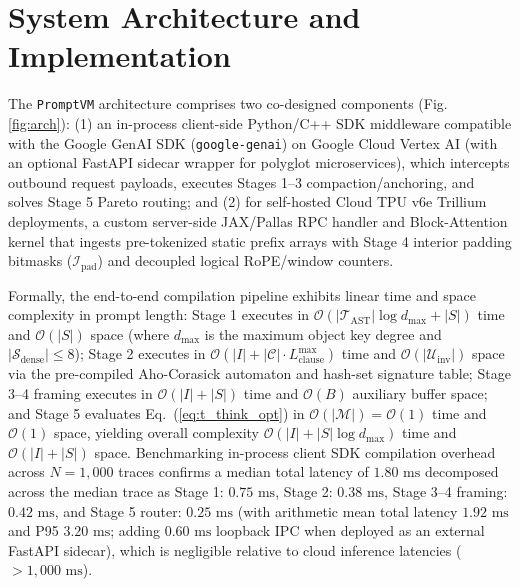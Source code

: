 \documentclass[conference,10pt]{IEEEtran}
\begin{document}
\section{System Architecture and Implementation}
\label{sec:impl}
The \texttt{PromptVM} architecture comprises two co-designed components (Fig. \ref{fig:arch}): (1) an in-process client-side Python/C++ SDK middleware compatible with the Google GenAI SDK (\texttt{google-genai}) on Google Cloud Vertex AI (with an optional FastAPI sidecar wrapper for polyglot microservices), which intercepts outbound request payloads, executes Stages 1--3 compaction/anchoring, and solves Stage 5 Pareto routing; and (2) for self-hosted Cloud TPU v6e Trillium deployments, a custom server-side JAX/Pallas RPC handler and Block-Attention kernel that ingests pre-tokenized static prefix arrays with Stage 4 interior padding bitmasks ($\mathcal{I}_{\text{pad}}$) and decoupled logical RoPE/window counters.

Formally, the end-to-end compilation pipeline exhibits linear time and space complexity in prompt length: Stage 1 executes in $\mathcal{O}(|\mathcal{T}_{\text{AST}}| \log d_{\max} + |S|)$ time and $\mathcal{O}(|S|)$ space (where $d_{\max}$ is the maximum object key degree and $|\mathcal{S}_{\text{dense}}| \le 8$); Stage 2 executes in $\mathcal{O}(|I| + |\mathcal{C}| \cdot L_{\text{clause}}^{\max})$ time and $\mathcal{O}(|\mathcal{U}_{\text{inv}}|)$ space via the pre-compiled Aho-Corasick automaton and hash-set signature table; Stage 3--4 framing executes in $\mathcal{O}(|I| + |S|)$ time and $\mathcal{O}(B)$ auxiliary buffer space; and Stage 5 evaluates Eq.~(\ref{eq:t_think_opt}) in $\mathcal{O}(|\mathcal{M}|) = \mathcal{O}(1)$ time and $\mathcal{O}(1)$ space, yielding overall complexity $\mathcal{O}(|I| + |S| \log d_{\max})$ time and $\mathcal{O}(|I| + |S|)$ space. Benchmarking in-process client SDK compilation overhead across $N = 1{,}000$ traces confirms a median total latency of $1.80\text{ ms}$ decomposed across the median trace as Stage 1: $0.75\text{ ms}$, Stage 2: $0.38\text{ ms}$, Stage 3--4 framing: $0.42\text{ ms}$, and Stage 5 router: $0.25\text{ ms}$ (with arithmetic mean total latency $1.92\text{ ms}$ and P95 $3.20\text{ ms}$; adding $0.60\text{ ms}$ loopback IPC when deployed as an external FastAPI sidecar), which is negligible relative to cloud inference latencies ($> 1{,}000\text{ ms}$).
\end{document}
